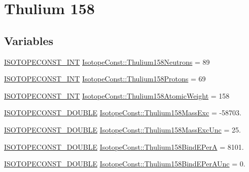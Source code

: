\hypertarget{group___isotope_const-_thulium-_tm158}{}\section{Thulium 158}
\label{group___isotope_const-_thulium-_tm158}
\subsection*{Variables}
\begin{DoxyCompactItemize}
\item 
\mbox{\hyperlink{group___isotope_const-_macros_ga5f18360b3e99483a35c32d789e62621c}{I\+S\+O\+T\+O\+P\+E\+C\+O\+N\+S\+T\+\_\+\+I\+NT}} \mbox{\hyperlink{group___isotope_const-_thulium-_tm158_ga5138e9da3b9702f6948f476d97cc40e2}{Isotope\+Const\+::\+Thulium158\+Neutrons}} = 89
\item 
\mbox{\hyperlink{group___isotope_const-_macros_ga5f18360b3e99483a35c32d789e62621c}{I\+S\+O\+T\+O\+P\+E\+C\+O\+N\+S\+T\+\_\+\+I\+NT}} \mbox{\hyperlink{group___isotope_const-_thulium-_tm158_ga6eb40dce7488321412b81ae02bb015cf}{Isotope\+Const\+::\+Thulium158\+Protons}} = 69
\item 
\mbox{\hyperlink{group___isotope_const-_macros_ga5f18360b3e99483a35c32d789e62621c}{I\+S\+O\+T\+O\+P\+E\+C\+O\+N\+S\+T\+\_\+\+I\+NT}} \mbox{\hyperlink{group___isotope_const-_thulium-_tm158_ga3a3a80fc3ef8c03f75bf420ea85d29fb}{Isotope\+Const\+::\+Thulium158\+Atomic\+Weight}} = 158
\item 
\mbox{\hyperlink{group___isotope_const-_macros_ga8f45a7272ce02c0b4c65c44636ed719a}{I\+S\+O\+T\+O\+P\+E\+C\+O\+N\+S\+T\+\_\+\+D\+O\+U\+B\+LE}} \mbox{\hyperlink{group___isotope_const-_thulium-_tm158_gaf1873f89d95fc9ddfea688217f515586}{Isotope\+Const\+::\+Thulium158\+Mass\+Exc}} = -\/58703.
\item 
\mbox{\hyperlink{group___isotope_const-_macros_ga8f45a7272ce02c0b4c65c44636ed719a}{I\+S\+O\+T\+O\+P\+E\+C\+O\+N\+S\+T\+\_\+\+D\+O\+U\+B\+LE}} \mbox{\hyperlink{group___isotope_const-_thulium-_tm158_ga22f79c6b1160a843845de5871de94bd5}{Isotope\+Const\+::\+Thulium158\+Mass\+Exc\+Unc}} = 25.
\item 
\mbox{\hyperlink{group___isotope_const-_macros_ga8f45a7272ce02c0b4c65c44636ed719a}{I\+S\+O\+T\+O\+P\+E\+C\+O\+N\+S\+T\+\_\+\+D\+O\+U\+B\+LE}} \mbox{\hyperlink{group___isotope_const-_thulium-_tm158_gaf1df6e8d8728bf6b558676479c6d307b}{Isotope\+Const\+::\+Thulium158\+Bind\+E\+PerA}} = 8101.
\item 
\mbox{\hyperlink{group___isotope_const-_macros_ga8f45a7272ce02c0b4c65c44636ed719a}{I\+S\+O\+T\+O\+P\+E\+C\+O\+N\+S\+T\+\_\+\+D\+O\+U\+B\+LE}} \mbox{\hyperlink{group___isotope_const-_thulium-_tm158_gad08b90070ab7aadc3a6586115b1739b2}{Isotope\+Const\+::\+Thulium158\+Bind\+E\+Per\+A\+Unc}} = 0.

\end{DoxyCompactItemize}
